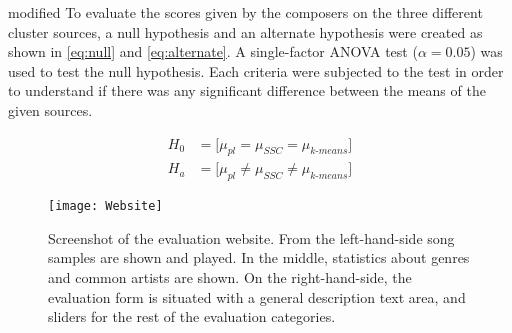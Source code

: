 \documentclass[../report.tex]{subfiles}
\begin{document}
\begin{color}{modified}
To evaluate the scores given by the composers on the three different cluster sources, a null hypothesis and an alternate hypothesis were created as shown in \cref{eq:null} and \cref{eq:alternate}.
A single-factor ANOVA test ($\alpha = 0.05$) was used to test the null hypothesis. Each criteria were subjected to the test in order to understand if there was any significant difference between the means of the given sources.

\begin{align}
  \label{eq:null}
  H_0 &= \bigg[ \mu_{\textit{pl}} = \mu_{\textit{SSC}} = \mu_{\textit{k-means}} \bigg] \\
  \label{eq:alternate}
  H_a &= \bigg[ \mu_{\textit{pl}} \neq \mu_{\textit{SSC}} \neq \mu_{\textit{k-means}} \bigg]
\end{align}

\end{color}

\begin{figure}[h!]
  \centering
\centerline{\texttt{[image: Website]}}
    \caption{Screenshot of the evaluation website. \newline
      From the left-hand-side song samples are shown and played. In the middle, statistics about genres and common artists are shown. On the right-hand-side, the evaluation form is situated with a general description text area, and sliders for the rest of the evaluation categories.
  }\label{fig:website}
\end{figure}
\end{document}
